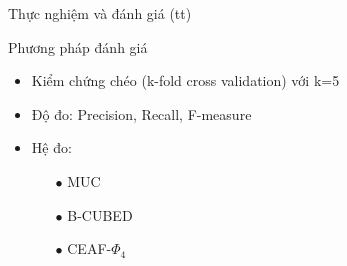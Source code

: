 \documentclass[9pt,xcolor=table,hyperref=unicode]{beamer}
\begin{document}
		\begin{frame}{Thực nghiệm và đánh giá (tt)}			
			\begin{block}{Phương pháp đánh giá}				
				\begin{itemize}
					\item{Kiểm chứng chéo (k-fold cross validation) với k=5}
					\item{Độ đo: Precision, Recall, F-measure}
					\item{Hệ đo: 
						\begin{itemize}
							\item[$\bullet$]{MUC}
							\item[$\bullet$]{B-CUBED}
							\item[$\bullet$]{CEAF-$\Phi_4$}
						\end{itemize}
					}					
				\end{itemize}		
			\end{block}					
		\end{frame}		
\end{document}
